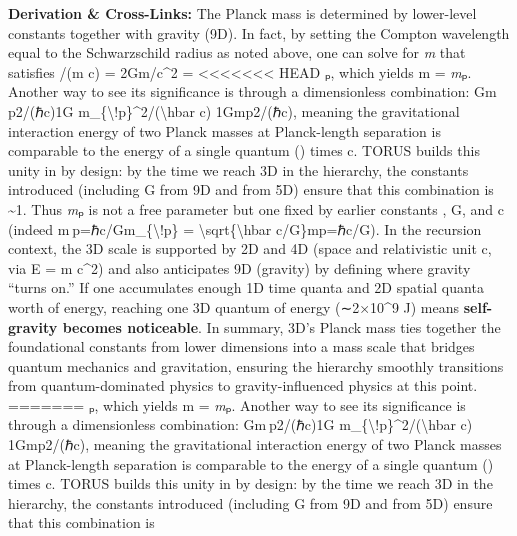 \documentclass[]{article}
\begin{document}
\textbf{Derivation \& Cross-Links:} The Planck mass is determined by
lower-level constants together with gravity (9D). In fact, by setting
the Compton wavelength equal to the Schwarzschild radius as noted above,
one can solve for \emph{m} that satisfies \hbar/(m c) = 2Gm/c\^{}2 =
<<<<<<< HEAD
\emph{\ell}ₚ, which yields m = \emph{m}ₚ\hspace{0pt}. Another way to see
its significance is through a dimensionless combination: Gm ⁣p2/(ℏc)\approx1G
m\_\{\textbackslash!p\}\^{}2/(\textbackslash hbar c) \approx
1Gmp2\hspace{0pt}/(ℏc)\hspace{0pt}, meaning the gravitational
interaction energy of two Planck masses at Planck-length separation is
comparable to the energy of a single quantum (\hbar) times c. TORUS builds
this unity in by design: by the time we reach 3D in the hierarchy, the
constants introduced (including G from 9D and \hbar from 5D) ensure that
this combination is \textasciitilde1\hspace{0pt}. Thus \emph{m}ₚ is not
a free parameter but one fixed by earlier constants \hbar, G, and c (indeed
m ⁣p=ℏc/Gm\_\{\textbackslash!p\} =
\textbackslash sqrt\{\textbackslash hbar
c/G\}mp\hspace{0pt}=ℏc/G\hspace{0pt}). In the recursion context, the 3D
scale is supported by 2D and 4D (space and relativistic unit c, via E =
m c\^{}2) and also anticipates 9D (gravity) by defining where gravity
``turns on.'' If one accumulates enough 1D time quanta and 2D spatial
quanta worth of energy, reaching one 3D quantum of energy (∼2×10\^{}9 J)
means \textbf{self-gravity becomes noticeable}\hspace{0pt}. In summary,
3D's Planck mass ties together the foundational constants from lower
dimensions into a mass scale that bridges quantum mechanics and
gravitation, ensuring the hierarchy smoothly transitions from
quantum-dominated physics to gravity-influenced physics at this point.
=======
\emph{\ell}ₚ, which yields m = \emph{m}ₚ​. Another way to see its
significance is through a dimensionless combination: Gm ⁣p2/(ℏc)\approx1G
m\_\{\textbackslash{}!p\}\^{}2/(\textbackslash{}hbar c) \approx
1Gmp2​/(ℏc)​, meaning the gravitational interaction energy of two
Planck masses at Planck-length separation is comparable to the energy of
a single quantum (\hbar) times c. TORUS builds this unity in by design: by
the time we reach 3D in the hierarchy, the constants introduced
(including G from 9D and \hbar from 5D) ensure that this combination is
\end{document}
